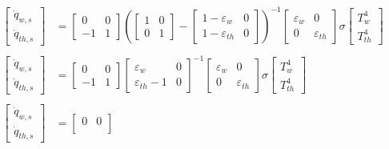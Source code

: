 \begin{align*}
	\begin{bmatrix}
	\dot{q}_{w,s} \\
	\dot{q}_{th,s}
	\end{bmatrix}
	&=
	\begin{bmatrix}
	0 & 0 \\
	-1 & 1
	\end{bmatrix}
	\left(
		\begin{bmatrix}
			1 & 0 \\
			0 & 1
		\end{bmatrix}
		-
		\begin{bmatrix}
			1 - \varepsilon_w & 0 \\
			1 - \varepsilon_{th} & 0
		\end{bmatrix}
	\right)^{-1}
	\begin{bmatrix}
	\varepsilon_w & 0 \\
	0 & \varepsilon_{th}
	\end{bmatrix}
	\sigma\begin{bmatrix}
	T_w^4 \\
	T_{th}^4
	\end{bmatrix}
	\\ \\
	\begin{bmatrix}
	\dot{q}_{w,s} \\
	\dot{q}_{th,s}
	\end{bmatrix}
	&=
		\begin{bmatrix}
	0 & 0 \\
	-1 & 1
	\end{bmatrix}
	\begin{bmatrix}
		\varepsilon_w & 0 \\
		\varepsilon_{th} - 1 & 0 
	\end{bmatrix}^{-1}
	\begin{bmatrix}
	\varepsilon_w & 0 \\
	0 & \varepsilon_{th}
	\end{bmatrix}
	\sigma\begin{bmatrix}
	T_w^4 \\
	T_{th}^4
	\end{bmatrix}
	\\ \\
		\begin{bmatrix}
	\dot{q}_{w,s} \\
	\dot{q}_{th,s}
	\end{bmatrix}
	&=
	\begin{bmatrix}
	0 & 0 \\

\end{bmatrix}
\end{align*}
